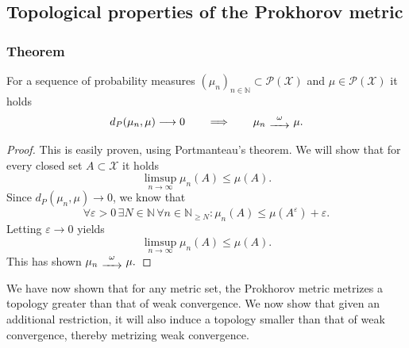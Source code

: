 \documentclass[11pt,a4paper]{article}
\begin{document}
\subsection{Topological properties of the Prokhorov metric}
\subsubsection{Theorem}
For a sequence of probability measures $(\mu_n)_{n\in\mathbb{N}}\subset\mathcal{P(X)}$ and $\mu\in\mathcal{P(X)}$ it holds
\[
d_P(\mu_n,\mu)\longrightarrow{}0\quad\quad\Longrightarrow\quad\quad\mu_n\,\,\substack{\omega \\ \xrightarrow{\hspace{1.2em}}}\,\,\mu.
\]
\begin{proof}
This is easily proven, using Portmanteau's theorem. We will show that for every closed set $A\subset\mathcal{X}$ it holds
\[
\limsup\limits_{n\rightarrow\infty}\mu_n(A)\leq\mu(A).
\]
Since $d_P(\mu_n,\mu)\longrightarrow{}0$, we know that 
\[
\forall\varepsilon>0\,\exists{}N\in\mathbb{N}\,\forall{}n\in\mathbb{N}_{\geq{}N} : \mu_n(A)\leq\mu(A^{\varepsilon})+\varepsilon.
\]
Letting $\varepsilon\longrightarrow{}0$ yields 
\[
\limsup\limits_{n\rightarrow\infty}\mu_n(A)\leq\mu(A).
\]
This has shown $\mu_n\,\,\substack{\omega\\ \xrightarrow{\hspace{1.2em}}}\,\,\mu.$ 
\end{proof}
\noindent{}We have now shown that for any metric set, the Prokhorov metric metrizes a topology greater than that of weak convergence. We now show that given an additional restriction, it will also induce a topology smaller than that of weak convergence, thereby metrizing weak convergence.
\end{document}

